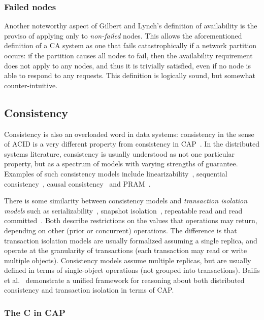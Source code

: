 \documentclass[a4paper,twocolumn,10pt]{article}
\begin{document}
\subsubsection{Failed nodes}\label{sec:failed-node-exception}

Another noteworthy aspect of Gilbert and Lynch's definition of availability is the proviso of
applying only to \emph{non-failed} nodes. This allows the aforementioned definition of a CA system
as one that fails catastrophically if a network partition occurs: if the partition causes all nodes
to fail, then the availability requirement does not apply to any nodes, and thus it is trivially
satisfied, even if no node is able to respond to any requests. This definition is logically sound,
but somewhat counter-intuitive.

\subsection{Consistency}\label{sec:consistency}

Consistency is also an overloaded word in data systems: consistency in the sense of ACID is a very
different property from consistency in CAP~\cite{Brewer2012ba}. In the distributed systems
literature, consistency is usually understood as not one particular property, but as a spectrum of
models with varying strengths of guarantee. Examples of such consistency models include
linearizability~\cite{Herlihy1990jq}, sequential consistency~\cite{Lamport1979ky}, causal
consistency~\cite{Ahamad1995gl} and PRAM~\cite{Lipton1988uh}.

There is some similarity between consistency models and \emph{transaction isolation models} such as
serializability~\cite{Bernstein1987va}, snapshot isolation~\cite{Berenson1995kj}, repeatable read
and read committed~\cite{Adya1999tx, Gray1976us}. Both describe restrictions on the values that
operations may return, depending on other (prior or concurrent) operations. The difference is that
transaction isolation models are usually formalized assuming a single replica, and operate at the
granularity of transactions (each transaction may read or write multiple objects). Consistency
models assume multiple replicas, but are usually defined in terms of single-object operations (not
grouped into transactions). Bailis et al.~\cite{Bailis2014vc} demonstrate a unified framework for
reasoning about both distributed consistency and transaction isolation in terms of CAP.


\subsubsection{The C in CAP}\label{sec:c-in-cap}
\end{document}
